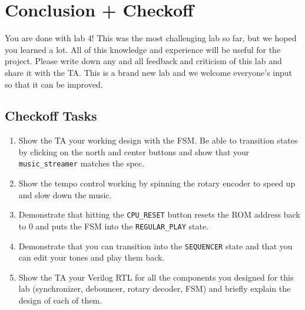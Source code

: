 \documentclass[11pt]{article}
\begin{document}
\section{Conclusion + Checkoff}
You are done with lab 4! This was the most challenging lab so far, but we hoped you learned a lot. All of this knowledge and experience will be useful for the project. Please write down any and all feedback and criticism of this lab and share it with the TA. This is a brand new lab and we welcome everyone's input so that it can be improved.\\

\subsection{Checkoff Tasks}

\begin{enumerate}
	\item Show the TA your working design with the FSM. Be able to transition states by clicking on the north and center buttons and show that your \verb|music_streamer| matches the spec.
	
	\item Show the tempo control working by spinning the rotary encoder to speed up and slow down the music.
	
	\item Demonstrate that hitting the \verb|CPU_RESET| button resets the ROM address back to 0 and puts the FSM into the \verb|REGULAR_PLAY| state.
	
	\item Demonstrate that you can transition into the \verb|SEQUENCER| state and that you can edit your tones and play them back. 
	
	\item Show the TA your Verilog RTL for all the components you designed for this lab (synchronizer, debouncer, rotary decoder, FSM) and briefly explain the design of each of them.
\end{enumerate}
\end{document}
